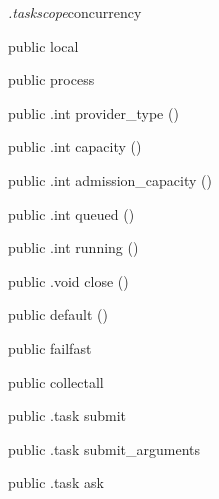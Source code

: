 \begin{CrexxClass}{\textit{.taskscope}}{concurrency}

  \begin{Hierarchy}
  \end{Hierarchy}

  \begin{Members}

    \Factory
      {public}
      {local}
      {}

    \Factory
      {public}
      {process}
      {}

    \Method
      {public}
      {.int}
      {provider\_type}
      {()}

    \Method
      {public}
      {.int}
      {capacity}
      {()}

    \Method
      {public}
      {.int}
      {admission\_capacity}
      {()}

    \Method
      {public}
      {.int}
      {queued}
      {()}

    \Method
      {public}
      {.int}
      {running}
      {()}

    \Method
      {public}
      {.void}
      {close}
      {()}

    \Factory
      {public}
      {default}
      {()}

    \Factory
      {public}
      {failfast}
      {}

    \Factory
      {public}
      {collectall}
      {}

    \Method
      {public}
      {.task}
      {submit}
      {}

    \Method
      {public}
      {.task}
      {submit\_arguments}
      {}

    \Method
      {public}
      {.task}
      {ask}
      {}


\end{Members}
\end{CrexxClass}

